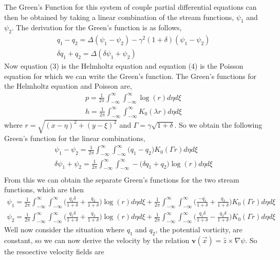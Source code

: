 \documentclass[12pt,twoside]{article}
\newcommand{\bs}  [1]{\boldsymbol{#1}}
\begin{document}
The Green's Function for this system of couple partial differential equations can then be obtained by taking a linear combination of the stream functions, $\psi_1$ and $\psi_2$. The derivation for the Green's function is as follows,
\begin{align}
q_1 - q_2=\Delta (\psi_1 - \psi_2) - \gamma^2(1+\delta)(\psi_1 - \psi_2) \\
\delta q_1 + q_2=\Delta(\delta \psi_1 + \psi_2)
\end{align}
Now equation (3) is the Helmholtz equation and equation (4) is the Poisson equation for which we can write the Green's function. The Green's functions for the Helmholtz equation and Poisson are,
\begin{align}
p=\frac{1}{2 \pi} \int_{-\infty}^{\infty} \int_{-\infty}^{\infty} \log(r) d\eta d \xi \\
h=\frac{1}{2 \pi} \int_{-\infty}^{\infty} \int_{-\infty}^{\infty} K_0(\lambda r) d\eta d \xi 
\end{align}
where $r=\sqrt{(x-\eta)^2 + (y - \xi)^2}$ and $\Gamma=\gamma \sqrt{1+\delta}$. So we obtain the following Green's function for the linear combinations,
\begin{align}
\psi_1 - \psi_2=\frac{1}{2 \pi} \int_{-\infty}^{\infty}\int_{-\infty}^{\infty}\Big(q_1 - q_2\Big) K_0(\Gamma r) d\eta d \xi \\
\delta \psi_1 + \psi_2=\frac{1}{2 \pi} \int_{-\infty}^{\infty}\int_{-\infty}^{\infty}-\Big(\delta q_1 + q_2\Big) \log (r) d\eta d \xi \\
\end{align}
From this we can obtain the separate Green's functions for the two stream functions, which are then 
\begin{align}
\psi_1=\frac{1}{2 \pi} \int_{-\infty}^{\infty}\int_{-\infty}^{\infty}\Big(\frac{q_1 \delta}{1+\delta} +  \frac{q_2}{1+\delta}\Big) \log (r) d\eta d \xi + \frac{1}{2 \pi} \int_{-\infty}^{\infty}\int_{-\infty}^{\infty}\Big(\frac{-q_1 }{1+\delta} +  \frac{q_2}{1+\delta}\Big) K_0 (\Gamma r) d\eta d \xi \\
\psi_2=\frac{1}{2 \pi} \int_{-\infty}^{\infty}\int_{-\infty}^{\infty}\Big(\frac{q_1 \delta}{1+\delta} +  \frac{q_2}{1+\delta}\Big) \log (r) d\eta d \xi + \frac{1}{2 \pi} \int_{-\infty}^{\infty}\int_{-\infty}^{\infty}\Big(\frac{q_1 \delta }{1+\delta} -  \frac{q_2 \delta}{1+\delta}\Big) K_0 (\Gamma r) d\eta d \xi
\end{align}
Well now consider the situation where $q_1$ and $q_2$, the potential vorticity, are constant, so we can now derive the velocity by the relation $\bs v(\vec{x})=\hat{z} \times \nabla \psi$. So the resoective velocity fields are
\end{document}
